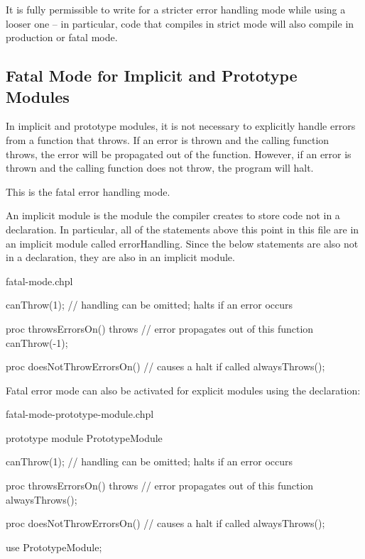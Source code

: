 It is fully permissible to write for a stricter error handling mode
while using a looser one -- in particular, code that compiles in strict
mode will also compile in production or fatal mode.

\subsection{Fatal Mode for Implicit and Prototype Modules}
\label{Errors_Fatal_Mode}

In implicit and prototype modules, it is not necessary to explicitly handle
errors from a function that throws. If an error is thrown and the calling
function throws, the error will be propagated out of the function.  However,
if an error is thrown and the calling function does not throw, the program
will halt.

This is the fatal error handling mode.

An implicit module is the module the compiler creates to store
code not in a  declaration. In particular, all of the
statements above this point in this file are in an implicit module called
errorHandling. Since the below statements are also not in a 
declaration, they are also in an implicit module.

\begin{chapelexample}{fatal-mode.chpl}
\begin{chapel}
canThrow(1); // handling can be omitted; halts if an error occurs

proc throwsErrorsOn() throws {
  // error propagates out of this function
  canThrow(-1);
}

proc doesNotThrowErrorsOn() {
  // causes a halt if called
  alwaysThrows();
}
\end{chapel}
\begin{chapelpost}
\end{chapelpost}
\begin{chapeloutput}
\end{chapeloutput}
\end{chapelexample}

Fatal error mode can also be activated for explicit modules using the
 declaration:

\begin{chapelexample}{fatal-mode-prototype-module.chpl}
\begin{chapel}
prototype module PrototypeModule {

  canThrow(1); // handling can be omitted; halts if an error occurs

  proc throwsErrorsOn() throws {
    // error propagates out of this function
    alwaysThrows();
  }

  proc doesNotThrowErrorsOn() {
    // causes a halt if called
    alwaysThrows();
  }
}

use PrototypeModule;
\end{chapel}
\begin{chapelpost}
\end{chapelpost}
\begin{chapeloutput}
\end{chapeloutput}
\end{chapelexample}

